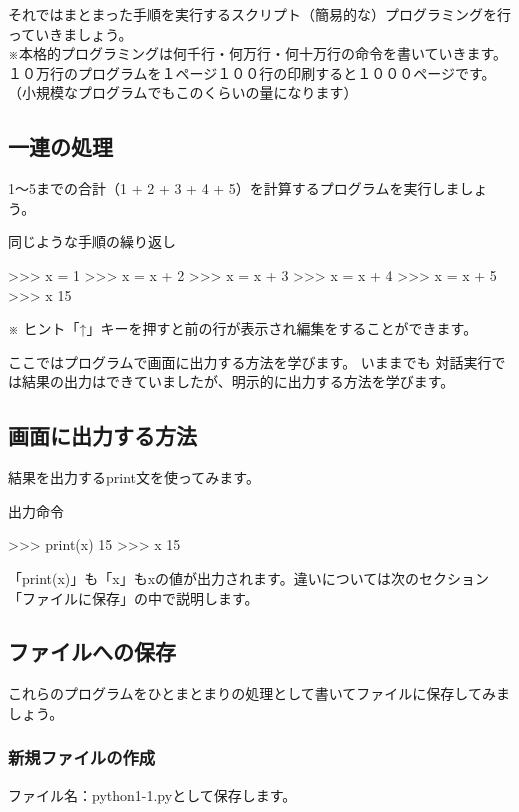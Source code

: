 \documentclass[11pt,a4paper,dvipdfmx,titlepage]{jsreport}
\begin{document}
それではまとまった手順を実行するスクリプト（簡易的な）プログラミングを行っていきましょう。\\

※本格的プログラミングは何千行・何万行・何十万行の命令を書いていきます。\\
１０万行のプログラムを１ページ１００行の印刷すると１０００ページです。（小規模なプログラムでもこのくらいの量になります）

\subsection{一連の処理}
1～5までの合計（1 + 2 + 3 + 4 + 5）を計算するプログラムを実行しましょう。

\begin{grabox}{同じような手順の繰り返し}
\begin{listing}{1}
>>> x = 1 
>>> x = x + 2
>>> x = x + 3
>>> x = x + 4
>>> x = x + 5
>>> x
15
\end{listing}
\end{grabox}
※ ヒント「↑」キーを押すと前の行が表示され編集をすることができます。

ここではプログラムで画面に出力する方法を学びます。
いままでも {\gt 対話実行}では結果の出力はできていましたが、明示的に出力する方法を学びます。


\subsection{画面に出力する方法}
結果を出力するprint文を使ってみます。
\begin{grabox}{出力命令}
\begin{listingcont}
>>> print(x)
15
>>> x
15
\end{listingcont}
\end{grabox}
「print(x)」も「x」もxの値が出力されます。違いについては次のセクション「ファイルに保存」の中で説明します。


\subsection{ファイルへの保存}
これらのプログラムをひとまとまりの処理として書いてファイルに保存してみましょう。

\subsubsection{新規ファイルの作成}

ファイル名：python1-1.pyとして保存します。
\end{document}

